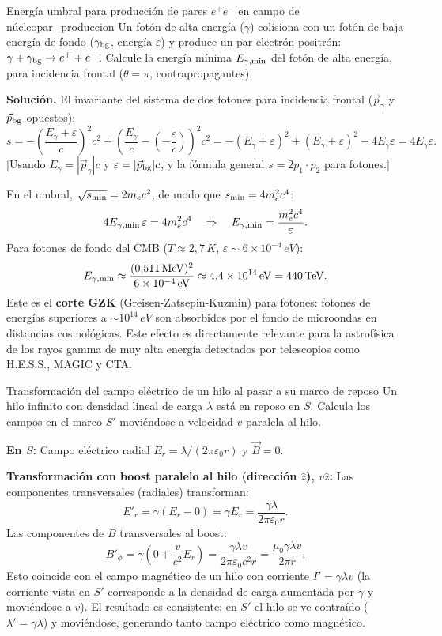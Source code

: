 \begin{ejemplo}{Energía umbral para producción de pares $e^+e^-$ en campo de núcleo}{par_produccion}
Un fotón de alta energía ($\gamma$) colisiona con un fotón de baja energía de fondo ($\gamma_{\rm bg}$, energía $\varepsilon$) y produce un par electrón-positrón: $\gamma + \gamma_{\rm bg} \to e^+ + e^-$. Calcule la energía mínima $E_{\gamma,\rm min}$ del fotón de alta energía, para incidencia frontal ($\theta = \pi$, contrapropagantes).

\textbf{Solución.} El invariante del sistema de dos fotones para incidencia frontal ($\vec{p}_{\gamma}$ y $\vec{p}_{\rm bg}$ opuestos):
\[
  s = -\left(\frac{E_\gamma + \varepsilon}{c}\right)^2 c^2 + \left(\frac{E_\gamma}{c} - \left(-\frac{\varepsilon}{c}\right)\right)^2 c^2
  = -(E_\gamma + \varepsilon)^2 + (E_\gamma + \varepsilon)^2 - 4E_\gamma\varepsilon
  = 4E_\gamma\varepsilon.
\]
[Usando $E_\gamma = |\vec{p}_\gamma|c$ y $\varepsilon = |\vec{p}_{\rm bg}|c$, y la fórmula general $s = 2p_1 \cdot p_2$ para fotones.]

En el umbral, $\sqrt{s_{\rm min}} = 2m_e c^2$, de modo que $s_{\rm min} = 4m_e^2 c^4$:
\[
  4E_{\gamma,\rm min}\,\varepsilon = 4m_e^2 c^4
  \quad\Rightarrow\quad
  E_{\gamma,\rm min} = \frac{m_e^2 c^4}{\varepsilon}.
\]
Para fotones de fondo del CMB ($T \approx 2{,}7\,\si{K}$, $\varepsilon \sim 6\times10^{-4}\,\si{eV}$):
\[
  E_{\gamma,\rm min} \approx \frac{(0{,}511\,\si{MeV})^2}{6\times10^{-4}\,\si{eV}}
  \approx 4{,}4 \times 10^{14}\,\si{eV} = 440\,\si{TeV}.
\]
Este es el \textbf{corte GZK} (Greisen-Zatsepin-Kuzmin) para fotones: fotones de energías superiores a $\sim 10^{14}\,\si{eV}$ son absorbidos por el fondo de microondas en distancias cosmológicas. Este efecto es directamente relevante para la astrofísica de los rayos gamma de muy alta energía detectados por telescopios como H.E.S.S., MAGIC y CTA.
\end{ejemplo}

\begin{ejemplo}{Transformación del campo eléctrico de un hilo al pasar a su marco de reposo}{}
Un hilo infinito con densidad lineal de carga $\lambda$ está en reposo en $S$. Calcula los campos en el marco $S'$ moviéndose a velocidad $v$ paralela al hilo.

\textbf{En $S$:} Campo eléctrico radial $E_r = \lambda/(2\pi\varepsilon_0 r)$ y $\vec{B} = 0$.

\textbf{Transformación con boost paralelo al hilo (dirección $\hat{z}$), $v\hat{z}$:} Las componentes transversales (radiales) transforman:
\[
  E'_r = \gamma(E_r - 0) = \gamma E_r = \frac{\gamma\lambda}{2\pi\varepsilon_0 r}.
\]
Las componentes de $B$ transversales al boost:
\[
  B'_\phi = \gamma\!\left(0 + \frac{v}{c^2}E_r\right) = \frac{\gamma\lambda v}{2\pi\varepsilon_0 c^2 r}
  = \frac{\mu_0\gamma\lambda v}{2\pi r}.
\]
Esto coincide con el campo magnético de un hilo con corriente $I' = \gamma\lambda v$ (la corriente vista en $S'$ corresponde a la densidad de carga aumentada por $\gamma$ y moviéndose a $v$). El resultado es consistente: en $S'$ el hilo se ve contraído ($\lambda' = \gamma\lambda$) y moviéndose, generando tanto campo eléctrico como magnético.
\end{ejemplo}

